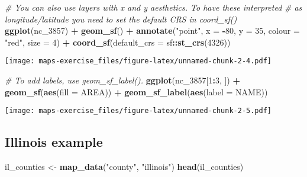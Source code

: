 \documentclass[
]{article}
\newenvironment{Shaded}{\begin{snugshade}}{\end{snugshade}}
\newcommand{\AttributeTok}[1]{\textcolor[rgb]{0.13,0.29,0.53}{#1}}
\newcommand{\CommentTok}[1]{\textcolor[rgb]{0.56,0.35,0.01}{\textit{#1}}}
\newcommand{\DecValTok}[1]{\textcolor[rgb]{0.00,0.00,0.81}{#1}}
\newcommand{\FunctionTok}[1]{\textcolor[rgb]{0.13,0.29,0.53}{\textbf{#1}}}
\newcommand{\NormalTok}[1]{#1}
\newcommand{\OtherTok}[1]{\textcolor[rgb]{0.56,0.35,0.01}{#1}}
\newcommand{\SpecialCharTok}[1]{\textcolor[rgb]{0.81,0.36,0.00}{\textbf{#1}}}
\newcommand{\StringTok}[1]{\textcolor[rgb]{0.31,0.60,0.02}{#1}}
\begin{document}
\begin{Shaded}
\begin{Highlighting}[]
\CommentTok{\# You can also use layers with x and y aesthetics. To have these interpreted}
\CommentTok{\# as longitude/latitude you need to set the default CRS in coord\_sf()}
\FunctionTok{ggplot}\NormalTok{(nc\_3857) }\SpecialCharTok{+}
  \FunctionTok{geom\_sf}\NormalTok{() }\SpecialCharTok{+}
  \FunctionTok{annotate}\NormalTok{(}\StringTok{"point"}\NormalTok{, }\AttributeTok{x =} \SpecialCharTok{{-}}\DecValTok{80}\NormalTok{, }\AttributeTok{y =} \DecValTok{35}\NormalTok{, }\AttributeTok{colour =} \StringTok{"red"}\NormalTok{, }\AttributeTok{size =} \DecValTok{4}\NormalTok{) }\SpecialCharTok{+}
  \FunctionTok{coord\_sf}\NormalTok{(}\AttributeTok{default\_crs =}\NormalTok{ sf}\SpecialCharTok{::}\FunctionTok{st\_crs}\NormalTok{(}\DecValTok{4326}\NormalTok{))}
\end{Highlighting}
\end{Shaded}

\texttt{[image: maps-exercise\_files/figure-latex/unnamed-chunk-2-4.pdf]}

\begin{Shaded}
\begin{Highlighting}[]
\CommentTok{\# To add labels, use geom\_sf\_label().}
\FunctionTok{ggplot}\NormalTok{(nc\_3857[}\DecValTok{1}\SpecialCharTok{:}\DecValTok{3}\NormalTok{, ]) }\SpecialCharTok{+}
   \FunctionTok{geom\_sf}\NormalTok{(}\FunctionTok{aes}\NormalTok{(}\AttributeTok{fill =}\NormalTok{ AREA)) }\SpecialCharTok{+}
   \FunctionTok{geom\_sf\_label}\NormalTok{(}\FunctionTok{aes}\NormalTok{(}\AttributeTok{label =}\NormalTok{ NAME))}
\end{Highlighting}
\end{Shaded}

\texttt{[image: maps-exercise\_files/figure-latex/unnamed-chunk-2-5.pdf]}

\hypertarget{illinois-example}{%
\subsection{Illinois example}\label{illinois-example}}

\begin{Shaded}
\begin{Highlighting}[]
\NormalTok{il\_counties }\OtherTok{\textless{}{-}} \FunctionTok{map\_data}\NormalTok{(}\StringTok{"county"}\NormalTok{, }\StringTok{"illinois"}\NormalTok{) }
\FunctionTok{head}\NormalTok{(il\_counties)}
\end{Highlighting}
\end{Shaded}
\end{document}
